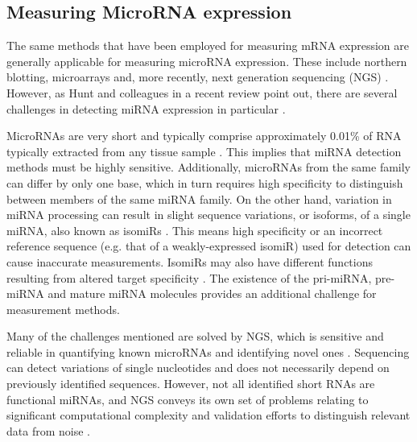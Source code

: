 \subsection{Measuring MicroRNA expression}

The same methods that have been employed for measuring mRNA
expression are generally applicable for measuring microRNA expression.
These include northern blotting, microarrays and, more recently, next
generation sequencing (NGS) \citep{Huang2011}. However, as Hunt and colleagues
in a recent review point out, there are several challenges in
detecting miRNA expression in particular \citep{Hunt2015}.

MicroRNAs are very short and typically comprise approximately 0.01\% of RNA
typically extracted from any tissue sample \citep{Dong2013}. This implies that
miRNA detection methods must be highly sensitive. Additionally, microRNAs from
the same family can differ by only one base, which in turn requires high
specificity to distinguish between members of the same miRNA family. On the
other hand, variation in miRNA processing can result in slight sequence
variations, or isoforms, of a single miRNA, also known as isomiRs
\citep{StaregaRoslan2011,Lee2010}. This means high specificity or an incorrect
reference sequence (e.g. that of a weakly-expressed isomiR) used for detection
can cause inaccurate measurements. IsomiRs may also have different functions
resulting from altered target specificity \citep{Chugh2012}. The existence of
the pri-miRNA, pre-miRNA and mature miRNA molecules provides an additional
challenge for measurement methods.

Many of the challenges mentioned are solved by NGS, which is sensitive and
reliable in quantifying known microRNAs and identifying novel ones
\citep{Huang2011}. Sequencing can detect variations of single nucleotides and
does not necessarily depend on previously identified sequences. However, not
all identified short RNAs are functional miRNAs, and NGS conveys its own set
of problems relating to significant computational complexity and
validation efforts to distinguish relevant data from noise
\citep{Chugh2012,Hunt2015}.
